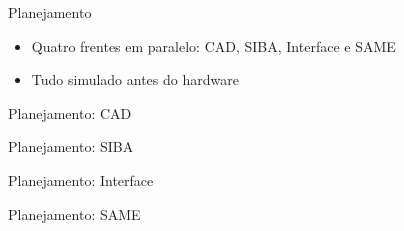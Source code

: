 \begin{frame}{Planejamento}
  \centering
  \vspace{0.6em}
  \begin{itemize}
    \item Quatro frentes em paralelo: CAD, SIBA, Interface e SAME
    \item Tudo simulado antes do hardware
  \end{itemize}
  \fonte
\end{frame}

\begin{frame}{Planejamento: CAD}
  \centering
  \fonte
\end{frame}

\begin{frame}{Planejamento: SIBA}
  \centering
  \fonte
\end{frame}

\begin{frame}{Planejamento: Interface}
  \centering
  \fonte
\end{frame}

\begin{frame}{Planejamento: SAME}
  \centering
  \fonte
\end{frame}

